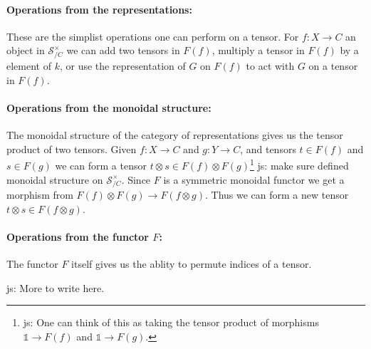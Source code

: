 \documentclass[a4paper, 11pt]{article}
\newcommand{\js}[1]{ {\color{magenta} js:  #1}}
\begin{document}
\paragraph{Operations from the representations:} These are the simplist operations one can perform 
on a tensor. For $f : X \to C$ an object in $\mathcal{S}_{/C}^\times$ we can add two tensors 
in $F(f)$, multiply a tensor in $F(f)$ by a element of $k$, or use the representation 
of $G$ on $F(f)$ to act with $G$ on a tensor in $F(f)$. 

\paragraph{Operations from the monoidal structure:} The monoidal structure of the category of 
representations gives us the tensor product of two tensors. 
Given $f : X \to C$ and $g : Y \to C$, and tensors $t \in F(f)$ and $s \in F(g)$ we can form
a tensor $t \otimes s \in F(f) \otimes F(g)$\footnote{\js{One can think of this as taking the tensor product of morphisms $\mathbb{1} \to F(f)$ and $\mathbb{1} \to F(g)$.}} \js{make sure defined monoidal structure on $\mathcal{S}_{/C}^\times$}. 
Since $F$ is a symmetric monoidal functor we get a morphism from $F(f) \otimes F(g) \to F(f \otimes g)$. 
Thus we can form a new tensor $t \otimes s \in F(f \otimes g)$.

\paragraph{Operations from the functor $F$:} The functor $F$ itself gives us 
the ablity to permute indices of a tensor.

\js{More to write here.}
\end{document}
